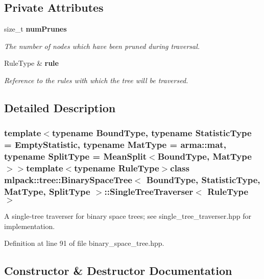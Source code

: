 \subsection*{Private Attributes}
\begin{DoxyCompactItemize}
\item 
size\-\_\-t {\bf num\-Prunes}
\begin{DoxyCompactList}\small\item\em The number of nodes which have been pruned during traversal. \end{DoxyCompactList}\item 
Rule\-Type \& {\bf rule}
\begin{DoxyCompactList}\small\item\em Reference to the rules with which the tree will be traversed. \end{DoxyCompactList}\end{DoxyCompactItemize}


\subsection{Detailed Description}
\subsubsection*{template$<$typename Bound\-Type, typename Statistic\-Type = Empty\-Statistic, typename Mat\-Type = arma\-::mat, typename Split\-Type = Mean\-Split$<$\-Bound\-Type, Mat\-Type$>$$>$template$<$typename Rule\-Type$>$class mlpack\-::tree\-::\-Binary\-Space\-Tree$<$ Bound\-Type, Statistic\-Type, Mat\-Type, Split\-Type $>$\-::\-Single\-Tree\-Traverser$<$ Rule\-Type $>$}

A single-\/tree traverser for binary space trees; see single\-\_\-tree\-\_\-traverser.\-hpp for implementation. 



Definition at line 91 of file binary\-\_\-space\-\_\-tree.\-hpp.



\subsection{Constructor \& Destructor Documentation}
